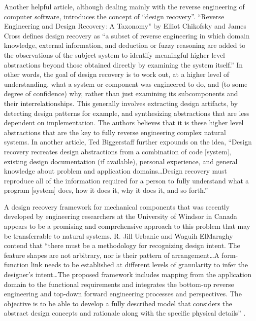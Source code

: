 Another helpful article, although dealing mainly with the reverse
engineering of computer software, introduces the concept of ``design
recovery''. ``Reverse Engineering and Design Recovery: A Taxonomy'' by
Elliot Chikofsky and James Cross defines design recovery as ``a subset
of reverse engineering in which domain knowledge, external information,
and deduction or fuzzy reasoning are added to the observations of the
subject system to identify meaningful higher level abstractions beyond
those obtained directly by examining the system
itself.''\citep{chikofskycross1990}
In other words, the goal of design
recovery is to work out, at a higher level of understanding, what a
system or component was engineered to do, and (to some degree of
confidence) why, rather than just examining its subcomponents and their
interrelationships. This generally involves extracting design
artifacts, by detecting design patterns for example, and synthesizing
abstractions that are less dependent on implementation. The authors
believes that it is these higher level abstractions that are the key to
fully reverse engineering complex natural systems. In another article,
Ted Biggerstaff further expounds on the idea, ``Design recovery
recreates design abstractions from a combination of code [system],
existing design documentation (if available), personal experience, and
general knowledge about problem and application domains{\ldots}Design recovery
must reproduce all of the information required for a person to fully
understand what a program [system] does, how it does it, why it does
it, and so forth.''\citep{biggerstaff1989}

A design recovery framework for mechanical components that was recently
developed by engineering researchers at the University of Windsor in
Canada appears to be a promising and comprehensive approach to this
problem that may be transferrable to natural systems. R. Jill Urbanic
and Waguih ElMaraghy contend that “there must be a methodology for
recognizing design intent. The feature shapes are not arbitrary, nor is
their pattern of arrangement{\ldots}A form-function link needs to be
established at different levels of granularity to infer the designer’s
intent{\ldots}The proposed framework includes mapping from the application
domain to the functional requirements and integrates the bottom-up
reverse engineering and top-down forward engineering processes and
perspectives. The objective is to be able to develop a fully described
model that considers the abstract design concepts and rationale along
with the specific physical details” \citep{urbanicelmaraghy2009}.


